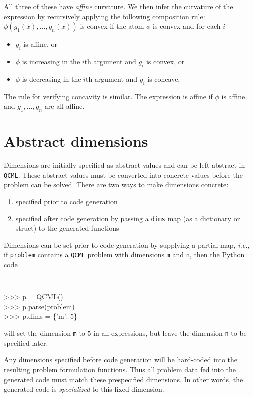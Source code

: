 \documentclass[11pt]{article}
\def\qcml{\texttt{QCML}\xspace}
\newcommand{\ie}{{\it i.e.}}
\begin{document}
All three of these have \emph{affine} curvature.
We then infer the curvature of the expression by recursively applying the
following composition rule:
$\phi(g_1(x),\ldots, g_n(x))$ is convex if the atom $\phi$ is convex and for each $i$
\begin{itemize}
  \item $g_i$ is affine, or
  \item $\phi$ is increasing in the $i$th argument and $g_i$ is convex, or 
  \item $\phi$ is decreasing in the $i$th argument and $g_i$ is
concave.
\end{itemize}
The rule for verifying concavity is similar.  The expression is
affine if $\phi$ is affine and $g_1,\ldots, g_n$ are all affine. 

\section{Abstract dimensions}
\label{s-abstract-dims}
Dimensions are initially specified as abstract values and can be left abstract
in \qcml. These abstract values must be converted into concrete values
before the problem can be solved. There are two ways to make dimensions 
concrete:
\begin{enumerate}
\item specified prior to code generation
\item specified after code generation by passing a {\tt dims} map (as a
  dictionary or struct) to the generated functions %
\end{enumerate}

Dimensions can be set prior to code generation by supplying
a partial map, \ie, if {\tt problem} contains a \qcml problem with 
dimensions \texttt{m} and \texttt{n}, then the Python code
{\tt
\begin{tabbing}
  \qquad \= >>> p = QCML() \\
  \> >>> p.parse(problem) \\
  \> >>> p.dims = \{'m': 5\}
\end{tabbing}
}
\noindent will set the dimension {\tt m} to $5$ in all expressions, but leave 
the dimension {\tt n} to be specified later.

Any dimensions specified before code generation will be hard-coded into the
resulting problem formulation functions. Thus all problem data fed into the
generated code must match these prespecified dimensions. In other words, the
generated code is \emph{specialized} to this fixed dimension.
\end{document}
